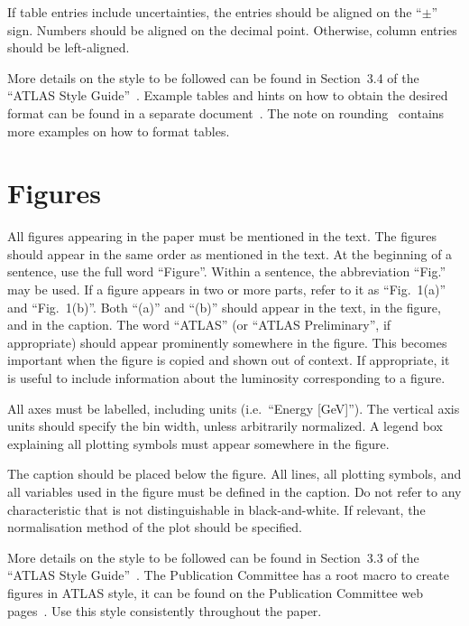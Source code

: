 \documentclass[UKenglish]{latex/atlasdoc}
\begin{document}
If table entries include uncertainties, the entries should be aligned
on the \enquote{$\pm$} sign. Numbers should be aligned on the decimal
point. Otherwise, column entries should be left-aligned.

More details on the style to be followed can be found in Section~3.4 of the \enquote{ATLAS Style Guide}~\cite{atlas-style}.
Example tables and hints on how to obtain the desired format can be found in a separate document~\cite{atlas-tables}.
The note on rounding~\cite{atlas-rounding} contains more examples on how to format tables.


\section{Figures}
\label{sec:figure}

All figures appearing in the paper must be mentioned in the text.
The figures should appear in the same order as mentioned in the text.
At the beginning of a sentence, use the full word \enquote{Figure}.
Within a sentence, the abbreviation \enquote{Fig.} may be used.
If a figure appears in two or more parts, refer to it as
\enquote{Fig.~1(a)} and \enquote{Fig.~1(b)}. Both \enquote{(a)} and \enquote{(b)} should
appear in the text, in the figure, and in the caption.
The word \enquote{ATLAS} (or \enquote{ATLAS Preliminary}, if appropriate) should
appear prominently somewhere in the figure. This becomes important when
the figure is copied and shown out of context. If appropriate, it
is useful to include information about the luminosity corresponding
to a figure.

All axes must be labelled, including units (i.e.\ \enquote{Energy [\si{\GeV}]}).
The vertical axis units should specify the bin width, unless
arbitrarily normalized. A legend box explaining all plotting symbols
must appear somewhere in the figure.

The caption should be placed below the figure.  All lines, all
plotting symbols, and all variables used in the figure must be defined
in the caption. Do not refer to any characteristic that is not
distinguishable in black-and-white.
If relevant, the normalisation method of the plot should be specified.

More details on the style to be followed can be found in Section~3.3 of the \enquote{ATLAS Style Guide}~\cite{atlas-style}.
The Publication Committee has a root macro to create figures in
ATLAS style, it can be found on the Publication Committee web pages~\cite{atlas-rootstyle}.
Use this style consistently throughout the paper.
\end{document}
